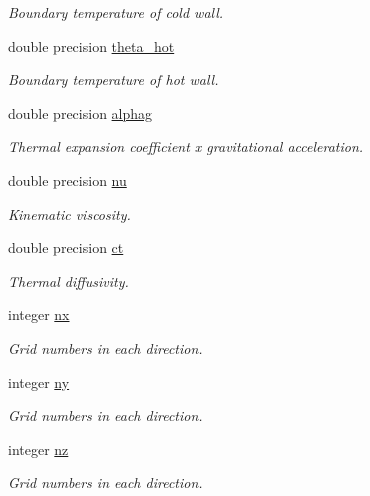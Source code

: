 \begin{DoxyCompactItemize}
\begin{DoxyCompactList}\small\item\em Boundary temperature of cold wall. \end{DoxyCompactList}\item 
double precision \mbox{\hyperlink{namespacemodule__global_a3631c83fdd972ed87e810c7f1c91cd46}{theta\+\_\+hot}}
\begin{DoxyCompactList}\small\item\em Boundary temperature of hot wall. \end{DoxyCompactList}\item 
double precision \mbox{\hyperlink{namespacemodule__global_adb7b5cd9635d90845f8b091ca401d382}{alphag}}
\begin{DoxyCompactList}\small\item\em Thermal expansion coefficient x gravitational acceleration. \end{DoxyCompactList}\item 
double precision \mbox{\hyperlink{namespacemodule__global_a43917539024b43bd2007b55a17813f70}{nu}}
\begin{DoxyCompactList}\small\item\em Kinematic viscosity. \end{DoxyCompactList}\item 
double precision \mbox{\hyperlink{namespacemodule__global_ab185cd164bb8dbff63e1fd6980be4f9d}{ct}}
\begin{DoxyCompactList}\small\item\em Thermal diffusivity. \end{DoxyCompactList}\end{DoxyCompactItemize}
\textbf{ }\par
\begin{DoxyCompactItemize}
\item 
integer \mbox{\hyperlink{namespacemodule__global_ab08f27937c57ba4ff61f3e468f1db2c4}{nx}}
\begin{DoxyCompactList}\small\item\em Grid numbers in each direction. \end{DoxyCompactList}\item 
integer \mbox{\hyperlink{namespacemodule__global_a77c7285b11685f1b1cf6a0bee5b1237f}{ny}}
\begin{DoxyCompactList}\small\item\em Grid numbers in each direction. \end{DoxyCompactList}\item 
integer \mbox{\hyperlink{namespacemodule__global_a5af0cf8dfa1e807f0ee9d14572e8b854}{nz}}
\begin{DoxyCompactList}\small\item\em Grid numbers in each direction. \end{DoxyCompactList}\end{DoxyCompactItemize}

